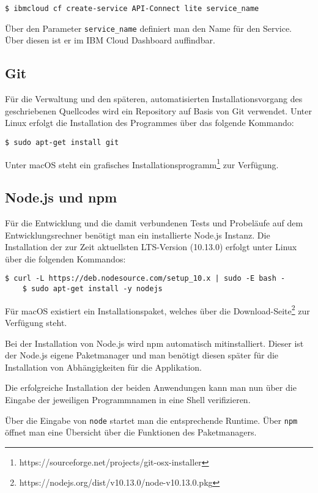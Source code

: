 \begin{lstlisting}[caption=Instanziierung von API Connect, label=ls:vorbereitung_apiconnect]
$ ibmcloud cf create-service API-Connect lite service_name
\end{lstlisting}

Über den Parameter \texttt{service\_name} definiert man den Name für den Service. Über diesen ist er im IBM Cloud
Dashboard auffindbar.

\subsection{Git}
Für die Verwaltung und den späteren, automatisierten Installationsvorgang des geschriebenen Quellcodes wird ein
Repository auf Basis von Git verwendet. Unter Linux erfolgt die Installation des Programmes über das folgende Kommando:

\begin{lstlisting}[caption=Installation von Git, label=ls:vorbereitung_git]
    $ sudo apt-get install git
\end{lstlisting}

Unter macOS steht ein grafisches Installationsprogramm\footnote{https://sourceforge.net/projects/git-osx-installer} zur
Verfügung.

\subsection{Node.js und npm}
Für die Entwicklung und die damit verbundenen Tests und Probeläufe auf dem Entwicklungsrechner benötigt man ein
installierte Node.js Instanz. Die Installation der zur Zeit aktuellsten LTS-Version (10.13.0) erfolgt unter Linux über
die folgenden Kommandos:

\begin{lstlisting}[caption=Installation von Node.js und npm, label=ls:vorbereitung_nodejs]
    $ curl -L https://deb.nodesource.com/setup_10.x | sudo -E bash -
    $ sudo apt-get install -y nodejs
\end{lstlisting}

Für macOS existiert ein Installationspaket, welches über die Download-Seite\footnote{https://nodejs.org/dist/v10.13.0/node-v10.13.0.pkg}
zur Verfügung steht.

Bei der Installation von Node.js wird npm automatisch mitinstalliert. Dieser ist der Node.js eigene Paketmanager und
man benötigt diesen später für die Installation von Abhängigkeiten für die Applikation.

Die erfolgreiche Installation der beiden Anwendungen kann man nun über die Eingabe der jeweiligen Programmnamen in eine
Shell verifizieren.

Über die Eingabe von \texttt{node} startet man die entsprechende Runtime. Über \texttt{npm} öffnet man eine Übersicht
über die Funktionen des Paketmanagers.